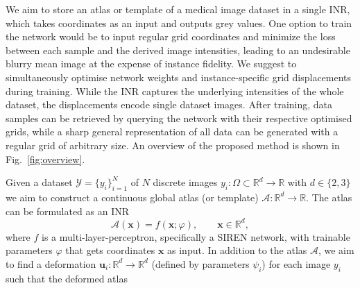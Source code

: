 We aim to store an atlas or template of a medical image dataset in a single INR, which takes coordinates as an input and outputs grey values. One option to train the network would be to input regular grid coordinates and minimize the loss between each sample and the derived image intensities, leading to an undesirable blurry mean image at the expense of instance fidelity. We suggest to simultaneously optimise network weights and instance-specific grid displacements during training. While the INR captures the underlying intensities of the whole dataset, the displacements encode single dataset images. After training, data samples can be retrieved by querying the network with their respective optimised grids, while a sharp general representation of all data can be generated with a regular grid of arbitrary size. An overview of the proposed method is shown in Fig.~\ref{fig:overview}. 

Given a dataset $\mathcal{Y} = \{y_i\}_{i=1}^{N}$ of $N$ discrete images $y_{i}: \Omega \subset \mathbb{R}^{d} \to \mathbb{R}$ with \mbox{$d \in \{2,3\}$} we aim to construct a continuous global atlas (or template) $\mathcal{A}: \mathbb{R}^{d} \to \mathbb{R}$. The atlas can be formulated as an INR
\begin{equation}
    \mathcal{A}(\bm{x}) = f(\bm{x};\varphi), \qquad \bm{x} \in \mathbb{R}^{d},
\end{equation}
where $f$ is a multi-layer-perceptron, specifically a SIREN network, with trainable parameters $\varphi$ that gets coordinates $\bm{x}$ as input. In addition to the atlas $\mathcal{A}$, we aim to find a deformation $\bm{u}_{i}:\mathbb{R}^{d} \to \mathbb{R}^{d}$ (defined by parameters $\psi_{i}$) for each image $y_{i}$ such that the deformed atlas

